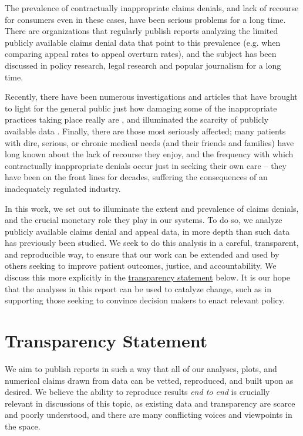 \documentclass[12pt, a4paper,twoside,parskip=full]{report}
\theoremstyle{plain} %
\theoremstyle{definition} %
\theoremstyle{remark} %
\numberwithin{equation}{chapter}
\begin{document}
		The prevalence of contractually inappropriate claims denials, and lack of recourse for consumers even in these cases, have been serious problems for a long time. There are organizations that regularly publish reports analyzing the limited publicly available claims denial data \cite{pollitz2021} that point to this prevalence (e.g. when comparing appeal rates to appeal overturn rates), and the subject has been discussed in policy research, legal research \cite{fox2022} and popular journalism \cite{konrad2010} for a long time.
		
		Recently, there have been numerous investigations and articles that have brought to light for the general public just how damaging some of the inappropriate practices taking place really are \cite{armstrong2023a} \cite{armstrong2023b}, and illuminated the scarcity of publicly available data \cite{fields2023}. Finally, there are those most seriously affected; many patients with dire, serious, or chronic medical needs (and their friends and families) have long known about the lack of recourse they enjoy, and the frequency with which contractually inappropriate denials occur just in seeking their own care -- they have been on the front lines for decades, suffering the consequences of an inadequately regulated industry.
		
		In this work, we set out to illuminate the extent and prevalence of claims denials,
		and the crucial monetary role they play in our systems. To do so, we analyze publicly
		available claims denial and appeal data, in more depth than such data has previously been
		studied. We seek to do this analysis in a careful, transparent,
		and reproducible way, to ensure that our work can be extended and used by others
		seeking to improve patient outcomes, justice, and accountability. We discuss this more
		explicitly in the \hyperref[reproducibilitystatement]{transparency statement} below. It is our hope
		that the analyses in this report can be used to catalyze change, such as in supporting those
		seeking to convince decision makers to enact relevant policy.
		
		\chapter{Transparency Statement}\label{reproducibilitystatement}
		
		We aim to publish reports in such a way that all of our analyses, plots,
		and numerical claims drawn from data can be vetted, reproduced, and built upon as desired.
		We believe the ability to reproduce results \emph{end to end} is crucially relevant in discussions
		of this topic, as existing data and transparency are scarce and poorly understood, and there are
		many conflicting voices and viewpoints in the space.
		
\end{document}
